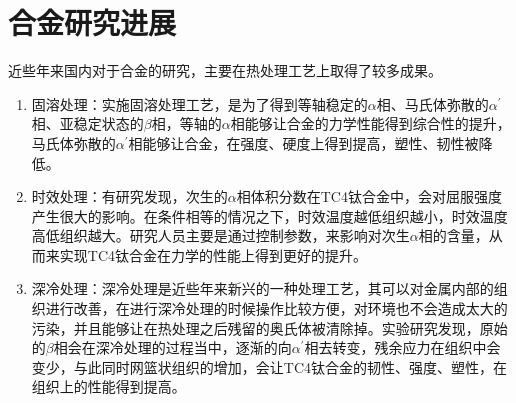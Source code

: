 %



\section{\ti 合金研究进展}
近些年来国内对于\ti 合金的研究，主要在热处理工艺上取得了较多成果\cite{guokaiTC4taihejinrechuligongyideyanjiuxianzhuangjijinzhan2021}。

\begin{enumerate}
	\item 固溶处理：实施固溶处理工艺，是为了得到等轴稳定的$\alpha$相、马氏体弥散的$ \alpha^{\prime} $相、亚稳定状态的$\beta$相，等轴的$\alpha$相能够让合金的力学性能得到综合性的提升，马氏体弥散的$ \alpha^{\prime} $相能够让合金，在强度、硬度上得到提高，塑性、韧性被降低\cite{gurong2002}。
	\item 时效处理：有研究\cite{luyuanyuanShixiaochuliduiTC4taihejinweiguanzuzhihelixuexingnengdeyingxiang2019}发现，次生的$\alpha$相体积分数在TC4钛合金中，会对屈服强度产生很大的影响。在条件相等的情况之下，时效温度越低组织越小，时效温度高低组织越大。研究人员主要是通过控制参数，来影响对次生$\alpha$相的含量，从而来实现TC4钛合金在力学的性能上得到更好的提升。
	\item 深冷处理：深冷处理是近些年来新兴的一种处理工艺，其可以对金属内部的组织进行改善，在进行深冷处理的时候操作比较方便，对环境也不会造成太大的污染，并且能够让在热处理之后残留的奥氏体被清除掉。实验研究发现，原始的$\beta$相会在深冷处理的过程当中，逐渐的向$\alpha^{\prime}$相去转变，残余应力在组织中会变少，与此同时网篮状组织的增加，会让TC4钛合金的韧性、强度、塑性，在组织上的性能得到提高。
\end{enumerate}

